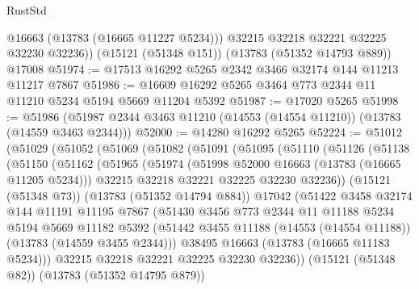 \begin{lexlean}{RustStd}
\begin{coremodule}
          @16663
          (@13783 (@16665 @11227 @5234)))
        @32215
        @32218
        @32221
        @32225
        @32230
        @32236))
    (@15121 (@51348 @151))
    (@13783 (@51352 @14793 @889))
    @17008
@51974 := @17513 @16292 @5265 @2342 @3466 @32174 @144 @11213 @11217 @7867
@51986 := @16609 @16292 @5265 @3464 @773 @2344 @11 @11210 @5234 @5194 @5669 @11204 @5392
@51987 := @17020 @5265
@51998 := @51986 (@51987 @2344 @3463 @11210 (@14553 (@14554 @11210)) (@13783 (@14559 @3463 @2344)))
@52000 := @14280 @16292 @5265
@52224 := @51012
    (@51029
      (@51052
        (@51069
          (@51082
            (@51091
              (@51095
                (@51110
                  (@51126
                    (@51138
                      (@51150
                        (@51162
                          (@51965
                            (@51974
                              (@51998 @52000 @16663 (@13783 (@16665 @11205 @5234)))
                              @32215
                              @32218
                              @32221
                              @32225
                              @32230
                              @32236))
                          (@15121 (@51348 @73))
                          (@13783 (@51352 @14794 @884))
                          @17042
                          (@51422
                            @3458
                            @32174
                            @144
                            @11191
                            @11195
                            @7867
                            (@51430
                              @3456
                              @773
                              @2344
                              @11
                              @11188
                              @5234
                              @5194
                              @5669
                              @11182
                              @5392
                              (@51442
                                @3455
                                @11188
                                (@14553 (@14554 @11188))
                                (@13783 (@14559 @3455 @2344)))
                              @38495
                              @16663
                              (@13783 (@16665 @11183 @5234)))
                            @32215
                            @32218
                            @32221
                            @32225
                            @32230
                            @32236))
                        (@15121 (@51348 @82))
                        (@13783 (@51352 @14795 @879))

\end{coremodule}
\end{lexlean}
